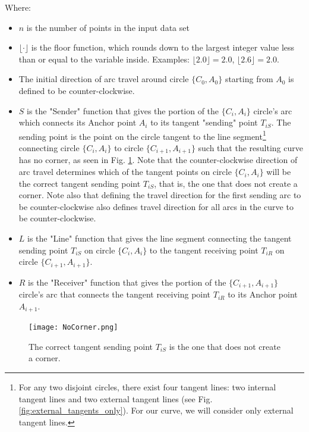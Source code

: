 \documentclass{article}
\begin{document}
Where:
\begin{itemize}
    \item $n$ is the number of points in the input data set
    \item $\lfloor \cdot \rfloor$ is the floor function, which rounds down to the largest integer value less than or equal to the variable inside. Examples: $\lfloor 2.0 \rfloor = 2.0$, $\lfloor 2.6 \rfloor = 2.0$.
    \item The initial direction of arc travel around circle $\{C_0, A_0\}$ starting from $A_0$ is defined to be counter-clockwise.
    \item $S$ is the "Sender" function that gives the portion of the $\{C_i, A_i\}$ circle's arc which connects its Anchor point $A_i$ to its tangent "sending" point $T_{iS}$. The sending point is the point on the circle tangent to the line segment\footnote{For any two disjoint circles, there exist four tangent lines: two internal tangent lines and two external tangent lines (see Fig. \ref{fig:external_tangents_only}). For our curve, we will consider only external tangent lines.} connecting circle $\{C_i, A_i\}$ to circle $\{C_{i+1}, A_{i+1}\}$ such that the resulting curve has no corner, as seen in Fig. \ref{fig:does_not_create_a_corner}.
    Note that the counter-clockwise direction of arc travel determines which of the tangent points on circle $\{C_i, A_i\}$ will be the correct tangent sending point $T_{iS}$, that is, the one that does not create a corner. Note also that defining the travel direction for the first sending arc to be counter-clockwise also defines travel direction for all arcs in the curve to be counter-clockwise.
    \item $L$ is the "Line" function that gives the line segment connecting the tangent sending point $T_{iS}$ on circle $\{C_i, A_i\}$ to the tangent receiving point $T_{iR}$ on circle $\{C_{i+1}, A_{i+1}\}$.
    \item $R$ is the "Receiver" function that gives the portion of the $\{C_{i+1}, A_{i+1}\}$ circle's arc that connects the tangent receiving point $T_{iR}$ to its Anchor point $A_{i+1}$.
\end{itemize}

\begin{figure}
    \centering
    \texttt{[image: NoCorner.png]}
    \caption{The correct tangent sending point $T_{iS}$ is the one that does not create a corner.}
    \label{fig:does_not_create_a_corner}
\end{figure}
\end{document}
